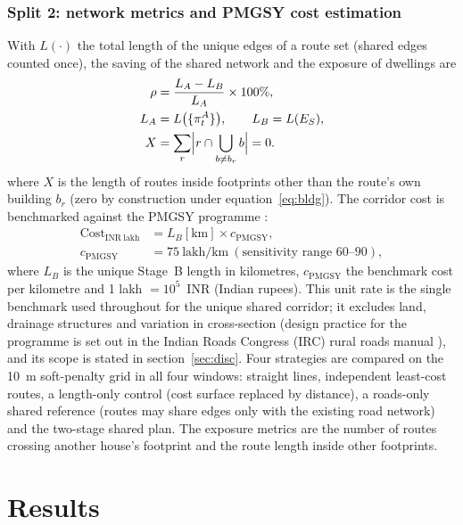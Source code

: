 \documentclass[10pt,a4paper,twocolumn]{article}
\begin{document}
\subsubsection{Split 2: network metrics and PMGSY cost estimation}\label{sec:eval}
With $L(\cdot)$ the total length of the unique edges of a route set (shared edges counted once), the saving of the shared network and the exposure of dwellings are
\begin{equation}
\begin{aligned}
\rho&=\frac{L_A-L_B}{L_A}\times100\%,\\
L_A&=L\bigl(\{\pi_t^A\}\bigr),\qquad L_B=L(E_S),\\
X&=\sum_{r}\Bigl|r\cap\bigcup_{b\ne b_r}b\Bigr|=0.
\end{aligned}
\label{eq:saving}
\end{equation}
where $X$ is the length of routes inside footprints other than the route's own building $b_r$ (zero by construction under equation~\ref{eq:bldg}). The corridor cost is benchmarked against the PMGSY programme \cite{pmgsy}:
\begin{equation}
\begin{aligned}
\mathrm{Cost}_{\mathrm{INR\ lakh}}&=L_B[\mathrm{km}]\times c_{\mathrm{PMGSY}},\\
c_{\mathrm{PMGSY}}&=75\ \text{lakh/km}\ (\text{sensitivity range }60\text{--}90),
\end{aligned}
\label{eq:cost}
\end{equation}
where $L_B$ is the unique Stage~B length in kilometres, $c_{\mathrm{PMGSY}}$ the benchmark cost per kilometre and 1 lakh $=10^{5}$~INR (Indian rupees). This unit rate is the single benchmark used throughout for the unique shared corridor; it excludes land, drainage structures and variation in cross-section (design practice for the programme is set out in the Indian Roads Congress (IRC) rural roads manual \cite{irc2002sp20}), and its scope is stated in section~\ref{sec:disc}. Four strategies are compared on the 10~m soft-penalty grid in all four windows: straight lines, independent least-cost routes, a length-only control (cost surface replaced by distance), a roads-only shared reference (routes may share edges only with the existing road network) and the two-stage shared plan. The exposure metrics are the number of routes crossing another house's footprint and the route length inside other footprints.

\section{Results}\label{sec:results}
\end{document}
